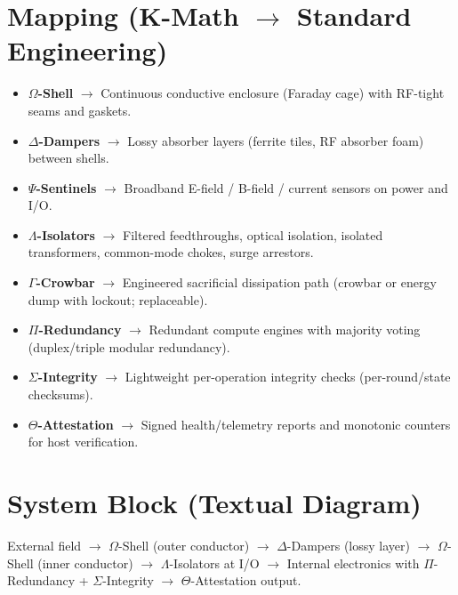 \documentclass[11pt, a4paper]{article}
\begin{document}
\section{Mapping (K-Math $\to$ Standard Engineering)}
\begin{itemize}
    \item \textbf{$\Omega$-Shell} $\to$ Continuous conductive enclosure (Faraday cage) with RF-tight seams and gaskets.
    \item \textbf{$\Delta$-Dampers} $\to$ Lossy absorber layers (ferrite tiles, RF absorber foam) between shells.
    \item \textbf{$\Psi$-Sentinels} $\to$ Broadband E-field / B-field / current sensors on power and I/O.
    \item \textbf{$\Lambda$-Isolators} $\to$ Filtered feedthroughs, optical isolation, isolated transformers, common-mode chokes, surge arrestors.
    \item \textbf{$\Gamma$-Crowbar} $\to$ Engineered sacrificial dissipation path (crowbar or energy dump with lockout; replaceable).
    \item \textbf{$\Pi$-Redundancy} $\to$ Redundant compute engines with majority voting (duplex/triple modular redundancy).
    \item \textbf{$\Sigma$-Integrity} $\to$ Lightweight per-operation integrity checks (per-round/state checksums).
    \item \textbf{$\Theta$-Attestation} $\to$ Signed health/telemetry reports and monotonic counters for host verification.
\end{itemize}

\section{System Block (Textual Diagram)}
External field $\to$ $\Omega$-Shell (outer conductor) $\to$ $\Delta$-Dampers (lossy layer) $\to$ $\Omega$-Shell (inner conductor) $\to$ $\Lambda$-Isolators at I/O $\to$ Internal electronics with $\Pi$-Redundancy + $\Sigma$-Integrity $\to$ $\Theta$-Attestation output.
\end{document}
